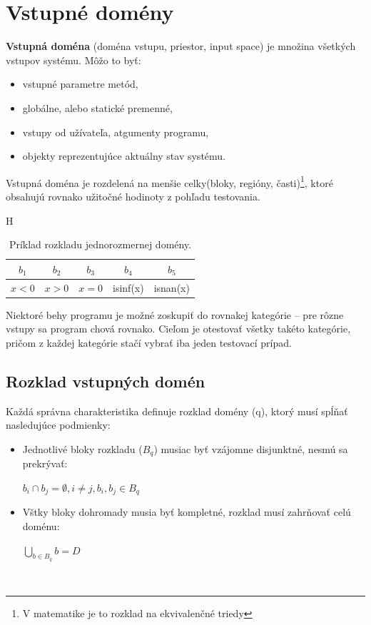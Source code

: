 \section{Vstupné domény}
\label{vstupne_domeny}
\textbf{Vstupná doména} (doména vstupu, priestor, input space) je množina všetkých vstupov systému.
Môžo to byť:
\begin{itemize}
	\item vstupné parametre metód,
	\item globálne, alebo statické premenné,
	\item vstupy od užívateľa, atgumenty programu,
	\item objekty reprezentujúce aktuálny stav systému.
\end{itemize}
Vstupná doména je rozdelená na menšie celky(bloky, regióny, časti)\footnote{V matematike je to rozklad na ekvivalenčné triedy}, ktoré obsahujú rovnako užitočné hodinoty z pohľadu testovania.
\begin{table}{H}
	\centering
	\begin{tabular}{ | c | c | c | c | c | }
		\hline
		$b_1$ & $b_2$ & $b_3$ & $b_4$ & $b_5$ \\
		\hline
		$x < 0$ & $x > 0$ & $x = 0$ & isinf(x) & isnan(x) \\
		\hline
	\end{tabular}
	\caption{Príklad rozkladu jednorozmernej domény.}
\end{table}

Niektoré behy programu je možné zoskupiť do rovnakej kategórie -- pre rôzne vstupy sa program chová rovnako.
Cieľom je otestovať všetky takéto kategórie, pričom z každej kategórie stačí vybrať iba jeden testovací prípad.

\subsection*{Rozklad vstupných domén}
\label{rozklad_domen}
Každá správna charakteristika definuje rozklad domény (q), ktorý musí spĺňať nasledujúce podmienky:
\begin{itemize}
	\item Jednotlivé bloky rozkladu ($B_q$) musiac byť vzájomne disjunktné, nesmú sa prekrývať:
		\begin{center}
			$b_i \cap b_j = \emptyset, i \not = j, b_i, b_j \in B_q$
		\end{center}
	\item Vštky bloky dohromady musia byť kompletné, rozklad musí zahrňovať celú doménu:
		\begin{center}
			$\underset{b \in B_q}{\bigcup} b = D$
		\end{center}
\end{itemize}
\\

